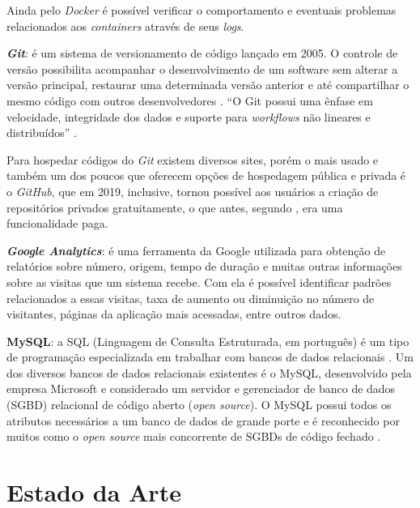 Ainda pelo \textit{Docker} é possível verificar o comportamento e eventuais problemas relacionados aos \textit{containers} através de seus \textit{logs}.

\textbf{\textit{Git}}: é um sistema de versionamento de código lançado em 2005. O controle de versão possibilita acompanhar o desenvolvimento de um
software sem alterar a versão principal, restaurar uma determinada versão anterior e até compartilhar o mesmo código com outros desenvolvedores \cite{palestinoestudo}. ``O Git possui uma ênfase em velocidade, integridade dos dados e suporte para \textit{workflows} não lineares e distribuídos'' \cite[p. 10]{ghezzi2015api}.

Para hospedar códigos do \textit{Git} existem diversos sites, porém o mais usado e também um dos poucos que oferecem opções de hospedagem pública e privada é o \textit{GitHub}, que em 2019, inclusive, tornou possível aos usuários a criação de repositórios privados gratuitamente, o que antes, segundo , era uma funcionalidade paga. 

\textbf{\textit{Google Analytics}}: é uma ferramenta da Google utilizada para obtenção de relatórios sobre número, origem, tempo de duração e muitas outras informações sobre as visitas que um sistema recebe. Com ela é possível identificar padrões relacionados a essas visitas, taxa de aumento ou diminuição no número de visitantes, páginas da aplicação mais acessadas, entre outros dados. 

\textbf{MySQL}: a SQL (Linguagem de Consulta Estruturada, em português) é um tipo de programação especializada em trabalhar com bancos de dados relacionais \cite[~p. 7, tradução nossa]{mysql2001mysql}. Um dos diversos bancos de dados relacionais existentes é o MySQL, desenvolvido pela empresa Microsoft e considerado um servidor e gerenciador de banco de dados (SGBD) relacional de código aberto (\textit{open source}). O MySQL possui todos os atributos necessários a um banco de dados de grande porte e é reconhecido por muitos como o \textit{open source} mais concorrente de SGBDs de código fechado \cite{milani2007mysql}.


\hspace{2.5cm}

\hspace{2.5cm}
\section{Estado da Arte}
\label{sec:trabalhoscorrelatos}
\hspace{2.5cm}

